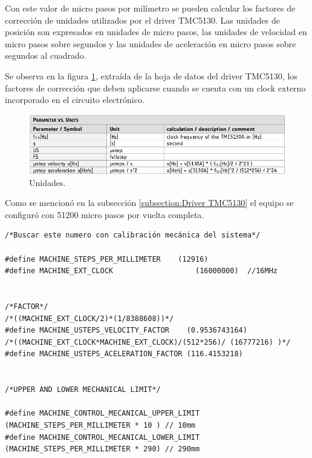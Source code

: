 Con este valor de micro pasos por milímetro se pueden calcular los factores de corrección de unidades utilizados por el driver TMC5130. Las unidades de posición son expresados en unidades de micro pasos, las unidades de velocidad en micro pasos sobre segundos y las unidades de aceleración en micro pasos sobre segundos al cuadrado.

Se observa en la figura \ref{fig:unidades}, extraída de la hoja de datos del driver TMC5130, los factores de corrección que deben aplicarse cuando se cuenta con un clock externo incorporado en el circuito electrónico.

\begin{figure}[h!]
	\centering
	\includegraphics[width=1\textwidth]{./Figures/unit.png}
	\caption{Unidades.}
	\label{fig:unidades}
\end{figure}


Como se mencionó en la subsección \ref{subsection:Driver TMC5130} el equipo se configuró con 51200 micro pasos por vuelta completa.  
 
 

\begin{lstlisting}[label=cod:vControl,caption=Macros de desplazamiento y factores de conversión.]  % Start your code-block
/*Buscar este numero con calibración mecánica del sistema*/

#define MACHINE_STEPS_PER_MILLIMETER	(12916)		
#define MACHINE_EXT_CLOCK					(16000000)	//16MHz


/*FACTOR*/
/*((MACHINE_EXT_CLOCK/2)*(1/8388608))*/	
#define MACHINE_USTEPS_VELOCITY_FACTOR	  (0.9536743164)
/*((MACHINE_EXT_CLOCK*MACHINE_EXT_CLOCK)/(512*256)/ (16777216) )*/
#define MACHINE_USTEPS_ACELERATION_FACTOR (116.4153218)


/*UPPER AND LOWER MECHANICAL LIMIT*/

#define MACHINE_CONTROL_MECANICAL_UPPER_LIMIT 	(MACHINE_STEPS_PER_MILLIMETER * 10 ) // 10mm
#define MACHINE_CONTROL_MECANICAL_LOWER_LIMIT	(MACHINE_STEPS_PER_MILLIMETER * 290) // 290mm

\end{lstlisting}






